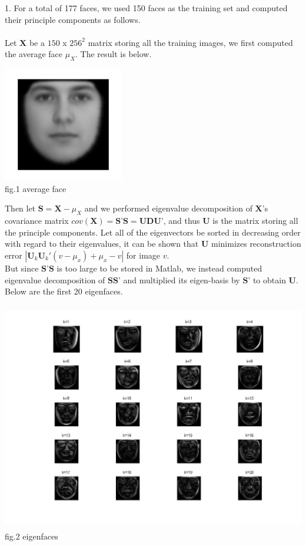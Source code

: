 \documentclass[12pt]{article}
\newenvironment{problem}[2][Part]{\begin{trivlist}
\item[\hskip \labelsep {\bfseries #1}\hskip \labelsep {\bfseries #2}]}{\end{trivlist}}
\begin{document}
\begin{problem}{1. ASM and AAM model for face reconstruction}
\item {1.}
For a total of 177 faces, we used 150 faces as the training set and computed their principle components as follows.\\\\
Let $\textbf{X}$ be a $150$ x $256^2$ matrix storing all the training images, we first computed the average face $\mu_X$. The result is below.
\begin{center}
		\includegraphics[height=5cm]{avgface.jpg}{\\fig.1 average face}
\end{center}
Then let $\textbf{S} = \textbf{X} - \mu_X$ and we performed eigenvalue decomposition of $\textbf{X}$'s covariance matrix $cov(\textbf{X})=\textbf{S'S}=\textbf{UDU'}$, and thus $\textbf{U}$ is the matrix storing all the principle components. Let all of the eigenvectors be sorted in decreasing order with regard to their eigenvalues, it can be shown that \textbf{U} minimizes reconstruction error $|\textbf{U}_k \textbf{U}_k'(v-\mu_x)+\mu_x - v|$ for image $v$.\\
But since $\textbf{S'S}$ is too large to be stored in Matlab, we instead computed eigenvalue decomposition of $\textbf{SS'}$ and multiplied its eigen-basis by $\textbf{S'}$ to obtain $\textbf{U}$. Below are the first 20 eigenfaces.\\
\begin{center}
		\includegraphics[height=10cm]{eigenfaces.jpg}{\\fig.2 eigenfaces}

\end{center}
\end{problem}
\end{document}
